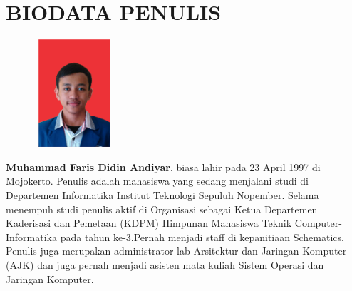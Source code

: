 \documentclass[12pt,oneside,reqno]{ta-its}
\begin{document}
	\frontmatter %
	\maketitle
	\legalityPaper %
	
    
	

	\cleardoublepage %

	\tableofcontents %
	\listoftables %
	\listoffigures %
	\lstlistoflistings %

	\mainmatter
	
	
	
	
	
	
	
	
	
	
    
    \renewcommand\chaptername{LAMPIRAN}
	\appendix
    
    

	\appendix

	\backmatter %

	\chapter{BIODATA PENULIS}
	\begin{figure}
		\includegraphics[width=3cm,height=4cm]{Images/fotoDiri.png}
	\end{figure}
	
	\textbf{Muhammad Faris Didin Andiyar}, biasa lahir pada 23 April 1997 di Mojokerto. Penulis adalah mahasiswa yang sedang menjalani studi di Departemen Informatika Institut Teknologi Sepuluh Nopember. Selama menempuh studi penulis aktif di Organisasi sebagai Ketua Departemen Kaderisasi dan Pemetaan (KDPM) Himpunan Mahasiswa Teknik Computer-Informatika pada tahun ke-3.Pernah menjadi staff di kepanitiaan Schematics. Penulis juga merupakan administrator lab Arsitektur dan Jaringan Komputer (AJK) dan juga pernah menjadi asisten mata kuliah Sistem Operasi dan Jaringan Komputer.\\
		
\end{document}
